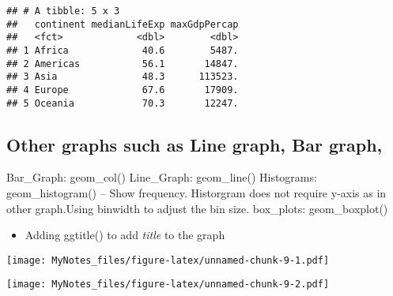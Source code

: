 \documentclass[]{article}
\newenvironment{Shaded}{\begin{snugshade}}{\end{snugshade}}
\newcommand{\KeywordTok}[1]{\textcolor[rgb]{0.13,0.29,0.53}{\textbf{#1}}}
\newcommand{\DataTypeTok}[1]{\textcolor[rgb]{0.13,0.29,0.53}{#1}}
\newcommand{\DecValTok}[1]{\textcolor[rgb]{0.00,0.00,0.81}{#1}}
\newcommand{\StringTok}[1]{\textcolor[rgb]{0.31,0.60,0.02}{#1}}
\newcommand{\CommentTok}[1]{\textcolor[rgb]{0.56,0.35,0.01}{\textit{#1}}}
\newcommand{\OperatorTok}[1]{\textcolor[rgb]{0.81,0.36,0.00}{\textbf{#1}}}
\newcommand{\NormalTok}[1]{#1}
\providecommand{\tightlist}{%
  \setlength{\itemsep}{0pt}\setlength{\parskip}{0pt}}
\begin{document}
\begin{verbatim}
## # A tibble: 5 x 3
##   continent medianLifeExp maxGdpPercap
##   <fct>             <dbl>        <dbl>
## 1 Africa             40.6        5487.
## 2 Americas           56.1       14847.
## 3 Asia               48.3      113523.
## 4 Europe             67.6       17909.
## 5 Oceania            70.3       12247.
\end{verbatim}

\subsection{Other graphs such as Line graph, Bar
graph,}\label{other-graphs-such-as-line-graph-bar-graph}

Bar\_Graph: geom\_col() Line\_Graph: geom\_line() Histograms:
geom\_histogram() -- Show frequency. Historgram does not require y-axis
as in other graph.Using binwidth to adjust the bin size. box\_plots:
geom\_boxplot()

\begin{itemize}
\tightlist
\item
  Adding ggtitle() to add \emph{title} to the graph
\end{itemize}

\begin{Shaded}
\end{Shaded}

\texttt{[image: MyNotes\_files/figure-latex/unnamed-chunk-9-1.pdf]}

\begin{Shaded}
\end{Shaded}

\texttt{[image: MyNotes\_files/figure-latex/unnamed-chunk-9-2.pdf]}
\end{document}
